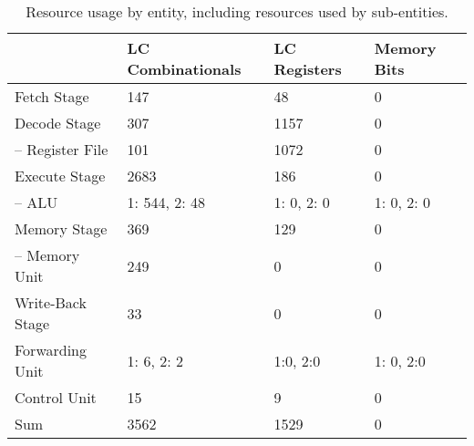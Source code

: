 \begin{table}[htb]
  \centering
  \caption{Resource usage by entity, including resources used by sub-entities.}
  \begin{tabular}{llll}
    \toprule
                         & LC Combinationals & LC Registers & Memory Bits \\
    \midrule
    Fetch Stage          & 147               & 48           & 0           \\
    Decode Stage         & 307               & 1157         & 0           \\
    -- Register File     & 101               & 1072         & 0           \\
    Execute Stage        & 2683              & 186          & 0           \\
    -- ALU               & 1: 544, 2: 48     & 1: 0, 2: 0   & 1: 0, 2: 0  \\
    Memory Stage         & 369               & 129          & 0           \\
    -- Memory Unit       & 249	             & 0            & 0           \\
    Write-Back Stage     & 33                & 0            & 0           \\
    Forwarding Unit      & 1: 6, 2: 2        & 1:0, 2:0     & 1: 0, 2:0   \\
    Control Unit         & 15                & 9            & 0           \\
    \cmidrule{1-4}
    Sum                  & 3562              & 1529         & 0           \\
    \bottomrule
  \end{tabular}
\end{table}

\begin{qa}
\end{qa}

